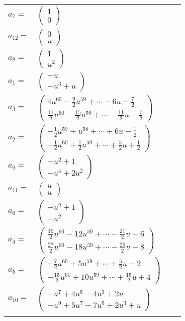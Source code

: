 \documentclass[1p]{elsarticle_modified}
\theoremstyle{definition}
\begin{document}
\begin{tabular}{m{7pt} m{180pt} m{7pt} m{180pt} }
\flushright $a_{7}=$&$\begin{pmatrix}1\\0\end{pmatrix}$ \\
\flushright $a_{12}=$&$\begin{pmatrix}0\\u\end{pmatrix}$ \\
\flushright $a_{8}=$&$\begin{pmatrix}1\\u^2\end{pmatrix}$ \\
\flushright $a_{1}=$&$\begin{pmatrix}- u\\- u^3+u\end{pmatrix}$ \\
\flushright $a_{3}=$&$\begin{pmatrix}4 u^{60}-\frac{9}{2} u^{59}+\cdots-6 u-\frac{7}{2}\\\frac{11}{2} u^{60}-\frac{15}{2} u^{59}+\cdots-\frac{11}{2} u-\frac{7}{2}\end{pmatrix}$ \\
\flushright $a_{2}=$&$\begin{pmatrix}-\frac{1}{2} u^{59}+u^{58}+\cdots+6 u-\frac{1}{2}\\-\frac{1}{2} u^{60}+\frac{1}{2} u^{59}+\cdots+\frac{5}{2} u+\frac{1}{2}\end{pmatrix}$ \\
\flushright $a_{9}=$&$\begin{pmatrix}- u^2+1\\- u^4+2 u^2\end{pmatrix}$ \\
\flushright $a_{11}=$&$\begin{pmatrix}u\\u\end{pmatrix}$ \\
\flushright $a_{6}=$&$\begin{pmatrix}- u^2+1\\- u^2\end{pmatrix}$ \\
\flushright $a_{4}=$&$\begin{pmatrix}\frac{19}{2} u^{60}-12 u^{59}+\cdots-\frac{21}{2} u-6\\\frac{27}{2} u^{60}-18 u^{59}+\cdots-\frac{25}{2} u-8\end{pmatrix}$ \\
\flushright $a_{5}=$&$\begin{pmatrix}-\frac{7}{2} u^{60}+5 u^{59}+\cdots+\frac{5}{2} u+2\\-\frac{15}{2} u^{60}+10 u^{59}+\cdots+\frac{15}{2} u+4\end{pmatrix}$ \\
\flushright $a_{10}=$&$\begin{pmatrix}- u^7+4 u^5-4 u^3+2 u\\- u^9+5 u^7-7 u^5+2 u^3+u\end{pmatrix}$\\&\end{tabular}
\end{document}
